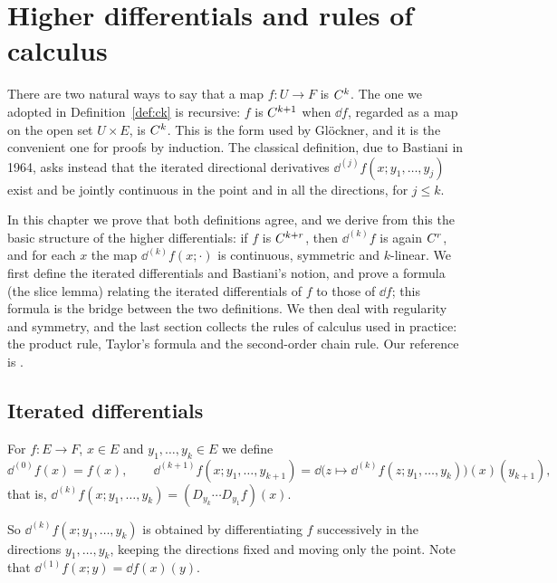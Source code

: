 \chapter{Higher differentials and rules of calculus}
\label{chap:higher}

There are two natural ways to say that a map $f \colon U \to F$ is $C^{k}$. The one we adopted
in Definition~\ref{def:ck} is recursive: $f$ is $C^{k+1}$ when $\dd f$, regarded as a map on the
open set $U \times E$, is $C^{k}$. This is the form used by Glöckner, and it is the convenient
one for proofs by induction. The classical definition, due to Bastiani \cite{Bas64} in 1964,
asks instead that the iterated directional derivatives $\dd^{(j)} f(x; y_1, \dots, y_j)$ exist
and be jointly continuous in the point and in all the directions, for $j \leq k$.

In this chapter we prove that both definitions agree, and we derive from this the basic
structure of the higher differentials: if $f$ is $C^{k+r}$, then $\dd^{(k)} f$ is again
$C^{r}$, and for each $x$ the map $\dd^{(k)} f(x; \cdot)$ is continuous, symmetric and
$k$-linear. We first define the iterated differentials and Bastiani's notion, and prove a
formula (the slice lemma) relating the iterated differentials of $f$ to those of $\dd f$; this
formula is the bridge between the two definitions. We then deal with regularity and symmetry, and
the last section collects the rules of calculus used in practice: the product rule, Taylor's
formula and the second-order chain rule. Our reference is \cite[\S1.3]{GN26}.

\section{Iterated differentials}

\begin{definition}
  \label{def:iterated}
  \leanok
  For $f \colon E \to F$, $x \in E$ and $y_1, \dots, y_k \in E$ we define
  \[
    \dd^{(0)} f(x) = f(x), \qquad
    \dd^{(k+1)} f(x; y_1, \dots, y_{k+1})
      = \dd\bigl(z \mapsto \dd^{(k)} f(z; y_1, \dots, y_k)\bigr)(x)(y_{k+1}),
  \]
  that is, $\dd^{(k)} f(x; y_1, \dots, y_k) = (D_{y_k} \cdots D_{y_1} f)(x)$.
\end{definition}

So $\dd^{(k)} f(x; y_1, \dots, y_k)$ is obtained by differentiating $f$ successively in the
directions $y_1, \dots, y_k$, keeping the directions fixed and moving only the point. Note that
$\dd^{(1)} f(x; y) = \dd f(x)(y)$.

